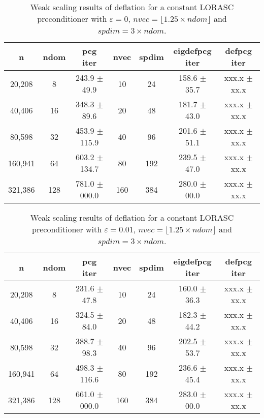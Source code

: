 \documentclass{article}
\begin{document}
\begin{table}[ht]
\caption{Weak scaling results of deflation for a constant LORASC preconditioner with $\varepsilon=0$, $nvec=\lfloor1.25\times ndom\rfloor$ and $spdim=3\times ndom$.}
\centering
	\begin{tabular}{|c|c|c|c|c|c|c|}
	\hline
	n & ndom & \makecell{pcg\\ iter} & nvec & spdim & \makecell{eigdefpcg\\ iter} & \makecell{defpcg\\ iter}\\
	\hline
	20,208  &   8 & 243.9 $\pm$  49.9 &  10 &  24 & 158.6 $\pm$ 35.7 & xxx.x $\pm$ xx.x \\
	40,406  &  16 & 348.3 $\pm$  89.6 &  20 &  48 & 181.7 $\pm$ 43.0 & xxx.x $\pm$ xx.x \\
	80,598  &  32 & 453.9 $\pm$ 115.9 &  40 &  96 & 201.6 $\pm$ 51.1 & xxx.x $\pm$ xx.x \\
	160,941 &  64 & 603.2 $\pm$ 134.7 &  80 & 192 & 239.5 $\pm$ 47.0 & xxx.x $\pm$ xx.x \\
	321,386 & 128 & 781.0 $\pm$ 000.0 & 160 & 384 & 280.0 $\pm$ 00.0 & xxx.x $\pm$ xx.x \\
	\hline
\end{tabular}
\label{Tab:010}
\end{table}

\begin{table}[ht]
	\caption{Weak scaling results of deflation for a constant LORASC preconditioner with $\varepsilon=0.01$, $nvec=\lfloor1.25\times ndom\rfloor$ and $spdim=3\times ndom$.}
	\centering
	\begin{tabular}{|c|c|c|c|c|c|c|}
	\hline
	n & ndom & \makecell{pcg\\ iter} & nvec & spdim & \makecell{eigdefpcg\\ iter} & \makecell{defpcg\\ iter}\\
	\hline
	20,208  &   8 & 231.6 $\pm$  47.8 &  10 &  24 & 160.0 $\pm$ 36.3 & xxx.x $\pm$ xx.x \\
	40,406  &  16 & 324.5 $\pm$  84.0 &  20 &  48 & 182.3 $\pm$ 44.2 & xxx.x $\pm$ xx.x \\
	80,598  &  32 & 388.7 $\pm$  98.3 &  40 &  96 & 202.5 $\pm$ 53.7 & xxx.x $\pm$ xx.x \\
	160,941 &  64 & 498.3 $\pm$ 116.6 &  80 & 192 & 236.6 $\pm$ 45.4 & xxx.x $\pm$ xx.x \\
	321,386 & 128 & 661.0 $\pm$ 000.0 & 160 & 384 & 283.0 $\pm$ 00.0 & xxx.x $\pm$ xx.x \\
	\hline
\end{tabular}
	\label{Tab:015}
\end{table}
\end{document}
